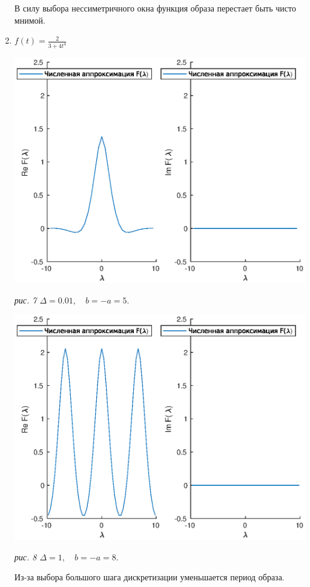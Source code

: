 \documentclass[11pt]{article}
\begin{document}
\begin{enumerate}
В силу выбора нессиметричного окна функция образа перестает быть чисто мнимой.

\newpage
\item $f\left(t\right) = \frac{2}{3+4t^4}$

\includegraphics[width=1.0\textwidth]{gr4_1.eps}
\begin{center}
\it{рис. 7 \quad $\Delta = 0.01, \quad b = -a = 5.$}
\end{center}

\includegraphics[width=1.0\textwidth]{gr4_2.eps}
\begin{center}
\it{рис. 8 \quad $\Delta = 1, \quad b = -a = 8.$}
\end{center}

Из-за выбора большого шага дискретизации уменьшается период образа.
\end{enumerate}
\end{document}
